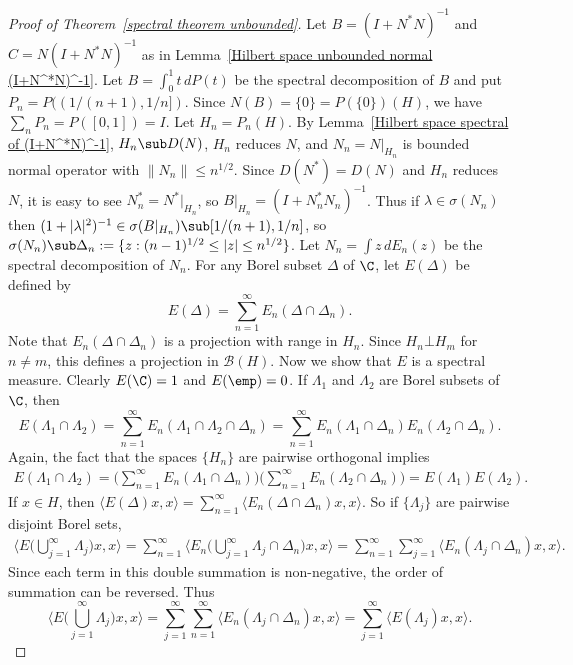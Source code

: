 \begin{proof}[Proof of Theorem~\ref{spectral theorem unbounded}]
Let $B=(I+N^*N)^{-1}$ and $C=N(I+N^*N)^{-1}$ as in Lemma~\ref{Hilbert space unbounded normal (I+N^*N)^-1}. Let $B=\int_0^1 t\,dP(t)$ be the spectral decomposition of $B$ and put $P_n=P((1/(n+1),1/n])$. Since $N(B)=\{0\}=P(\{0\})(H)$, we have $\sum_nP_n=P([0,1])=I$. Let $H_n=P_n(H)$. By Lemma~\ref{Hilbert space spectral of (I+N^*N)^-1}, $H_n\sub D(N)$, $H_n$ reduces $N$, and $N_n=N|_{H_n}$ is bounded normal operator with $\|N_n\|\leq n^{1/2}$. Since $D(N^*)=D(N)$ and $H_n$ reduces $N$, it is easy to see $N_n^*=N^*|_{H_n}$, so $B|_{H_n}=(I+N_n^*N_n)^{-1}$. Thus if $\lambda\in\sigma(N_n)$ then $(1+|\lambda|^2)^{-1}\in\sigma(B|_{H_n})\sub[1/(n+1),1/n]$, so $\sigma(N_n)\sub\Delta_n:=\{z:(n-1)^{1/2}\leq|z|\leq n^{1/2}\}$. Let $N_n=\int z\,dE_n(z)$ be the spectral decomposition of $N_n$. For any Borel subset $\Delta$ of $\C$, let $E(\Delta)$ be defined by
\[E(\Delta)=\sum_{n=1}^{\infty}E_n(\Delta\cap\Delta_n).\]
Note that $E_n(\Delta\cap\Delta_n)$ is a projection with range in $H_n$. Since $H_n\bot H_m$ for $n\neq m$, this defines a projection in $\mathcal{B}(H)$. Now we show that $E$ is a spectral measure. Clearly $E(\C)=1$ and $E(\emp)=0$. If $\Lambda_1$ and $\Lambda_2$ are Borel subsets of $\C$, then
\[E(\Lambda_1\cap\Lambda_2)=\sum_{n=1}^{\infty}E_n(\Lambda_1\cap\Lambda_2\cap\Delta_n)=\sum_{n=1}^{\infty}E_n(\Lambda_1\cap\Delta_n)E_n(\Lambda_2\cap\Delta_n).\]
Again, the fact that the spaces $\{H_n\}$ are pairwise orthogonal implies
\begin{align*}
E(\Lambda_1\cap\Lambda_2)=\Big(\sum_{n=1}^{\infty}E_n(\Lambda_1\cap\Delta_n)\Big)\Big(\sum_{n=1}^{\infty}E_n(\Lambda_2\cap\Delta_n)\Big)=E(\Lambda_1)E(\Lambda_2).
\end{align*}
If $x\in H$, then $\langle E(\Delta)x,x\rangle=\sum_{n=1}^{\infty}\langle E_n(\Delta\cap\Delta_n)x,x\rangle$. So if $\{\Lambda_j\}$ are pairwise disjoint Borel sets,
\begin{align*}
\langle E\Big(\bigcup_{j=1}^{\infty}\Lambda_j\Big)x,x\rangle=\sum_{n=1}^{\infty}\langle E_n\Big(\bigcup_{j=1}^{\infty}\Lambda_j\cap\Delta_n\Big)x,x\rangle=\sum_{n=1}^{\infty}\sum_{j=1}^{\infty}\langle E_n(\Lambda_j\cap\Delta_n)x,x\rangle.
\end{align*}
Since each term in this double summation is non-negative, the order of summation can be reversed. Thus
\[\langle E\Big(\bigcup_{j=1}^{\infty}\Lambda_j\Big)x,x\rangle=\sum_{j=1}^{\infty}\sum_{n=1}^{\infty}\langle E_n(\Lambda_j\cap\Delta_n)x,x\rangle=\sum_{j=1}^{\infty}\langle E(\Lambda_j)x,x\rangle.\]

\end{proof}
